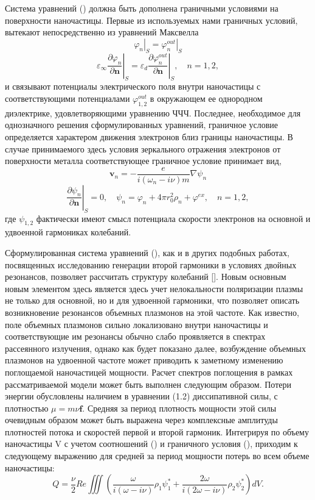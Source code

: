 \documentclass[12pt, a4paper]{article}
\renewcommand{\vec}{\mathbf}
\def \eps {\varepsilon}
\def \w {\omega}
\def \ph {\varphi}
\newcommand{\dn}[1]{\left.\frac{\partial #1}{\partial \vec{n}}\right|_{ S}}
\begin{document}
Система уравнений () должна быть дополнена граничными условиями на поверхности наночастицы. Первые из используемых нами граничных условий, вытекают непосредственно из уравнений Максвелла
\begin{equation} 
	\left. \ph_n \right|_{ S} = \left. \ph_n^{out} \right|_{ S} 
\end{equation}
\begin{equation} 
	\eps_\infty \dn{\ph_n} = \eps_d \dn{\ph_n^{out}}, \quad n = 1,2,  
\end{equation}
и связывают потенциалы электрического поля внутри наночастицы с соответствующими потенциалами $\ph_{1,2}^{out}$ в окружающем ее однородном диэлектрике, удовлетворяющими уравнению ЧЧЧ.
Последнее, необходимое для однозначного решения сформулированных уравнений, граничное условие определяется характером движения электронов близ границы наночастицы. В случае принимаемого здесь условия зеркального отражения электронов от поверхности металла соответствующее граничное условие принимает вид, 
\begin{equation} 
\vec{v}_n = -\frac{e}{i(\w_n - i\nu)m} \nabla \psi_n
\end{equation}
\begin{equation} 
\dn{\psi_n}	= 0, \quad \psi_n = \ph_n + 4 \pi r_0^2 \rho_n + \ph^{ex}, \quad n = 1,2,  
\end{equation}
где $\psi_{1,2}$ фактически имеют смысл потенциала скорости электронов на основной и удвоенной гармониках колебаний.

Сформулированная система уравнений (), как и в других подобных работах, посвященных исследованию генерации второй гармоники в условиях двойных резонансов, позволяет рассчитать структуру колебаний []. Новым основным новым элементом здесь является здесь учет нелокальности поляризации плазмы не только для основной, но и для удвоенной гармоники, что позволяет описать возникновение резонансов объемных плазмонов на этой частоте. Как известно, поле объемных плазмонов сильно локализовано внутри наночастицы и соответствующие им резонансы обычно слабо проявляется в спектрах рассеянного излучения, однако как будет показано далее, возбуждение объемных плазмонов на удвоенной частоте может приводить к заметному изменению поглощаемой наночастицей мощности. Расчет спектров поглощения в рамках рассматриваемой модели может быть выполнен следующим образом. Потери энергии обусловлены наличием в уравнении (1.2) диссипативной силы, с плотностью $\mu = m \nu \vec{f}$. Средняя за период плотность мощности этой силы очевидным образом может быть выражена через комплексные амплитуды плотностей потока и скоростей первой и второй гармоник. Интегрируя по объему наночастицы V с учетом соотношений () и граничного условия (), приходим к следующему выражению для средней за период мощности потерь во всем объеме наночастицы: 
\begin{equation} 
Q = \frac{\nu}{2} Re \iiint (\frac{\w}{i(\w - i \nu)}\rho_1 \psi_1^* + \frac{2\w}{i(2\w - i \nu)}\rho_2 \psi_2^*)dV.
\end{equation}
\end{document}
